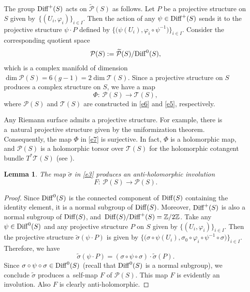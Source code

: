 \documentclass[pdftex]{sigma}
\numberwithin{equation}{section}
\newtheorem{Lemma}[Theorem]{Lemma}
\begin{document}
The group ${\rm Diff}^+(S)$ acts on $\widetilde{\mathcal P}(S)$ as follows. Let $P$ be a projective structure on
$S$ given by~$\{(U_i, \varphi_i)\}_{i\in I}$. Then the action of any $\psi \in {\rm Diff}^+(S)$ sends it to
the projective structure $\psi\cdot P$ defined by $\big\{\bigl(\psi(U_i), \varphi_i\circ\psi^{-1}\bigr)\big\}_{i\in I}$.
Consider the corresponding quotient space
\begin{equation}\label{e6}
{\mathcal P}(S) :=
\widetilde{\mathcal P}(S)/{\rm Diff}^0(S),
\end{equation}
which is a complex manifold of dimension $\dim {\mathcal P}(S) = 6(g-1) = 2\dim {\mathcal T}(S)$.
Since a projective structure on $S$ produces a complex structure on $S$, we have a map
\begin{equation}\label{e7}
\Phi\colon\ {\mathcal P}(S) \longrightarrow {\mathcal T}(S),
\end{equation}
where ${\mathcal P}(S)$ and ${\mathcal T}(S)$ are constructed in \eqref{e6} and \eqref{e5}, respectively.

\begin{Remark} Any Riemann surface admits a projective structure.
For example, there is a~natural projective structure given by the uniformization theorem. Consequently, the map
$\Phi$ in \eqref{e7} is surjective. In fact, $\Phi$ is a holomorphic map, and ${\mathcal
P}(S)$ is a holomorphic torsor over ${\mathcal T}(S)$ for the holomorphic cotangent bundle
$T^*{\mathcal T}(S)$ (see \cite{Gu, He, Hu}).
\end{Remark}

\begin{Lemma}\label{lemmae8}
The map $\widetilde{\sigma}$ in \eqref{e3} produces an anti-holomorphic
involution
\begin{equation}\label{e8}
F\colon\ {\mathcal P}(S) \longrightarrow {\mathcal P}(S).
\end{equation}
\end{Lemma}

\begin{proof}
Since ${\rm Diff}^0(S)$ is the connected component of ${\rm Diff}(S)$ containing the identity element, it is a normal subgroup
of ${\rm Diff}(S)$. Moreover, ${\rm Diff}^+(S)$ is also a normal subgroup of ${\rm Diff}(S)$, and~${\rm Diff}(S)/{\rm
Diff}^+(S) = {\mathbb Z}/2{\mathbb Z}$. Take any $\psi \in {\rm Diff}^0(S)$ and any projective structure $P$ on
$S$ given by $\{(U_i, \varphi_i)\}_{i\in I}$. Then the projective structure $\widetilde{\sigma}(\psi\cdot P)$ is given
by $\big\{\bigl(\sigma\circ \psi(U_i), \sigma_0\circ\varphi_i\circ\psi^{-1}\circ\sigma\bigr)\big\}_{i\in I}$. Therefore, we have
\[
\widetilde{\sigma}(\psi\cdot P) = (\sigma\circ\psi\circ\sigma)\cdot\widetilde{\sigma}(P).
\]
Since $\sigma\circ\psi\circ\sigma \in {\rm Diff}^0(S)$ (recall that ${\rm Diff}^0(S)$ is a normal subgroup), we
conclude $\widetilde{\sigma}$ produces a~self-map $F$ of ${\mathcal P}(S)$. This map $F$ is evidently an involution.
Also $F$ is clearly anti-holomorphic.
\end{proof}
\end{document}
